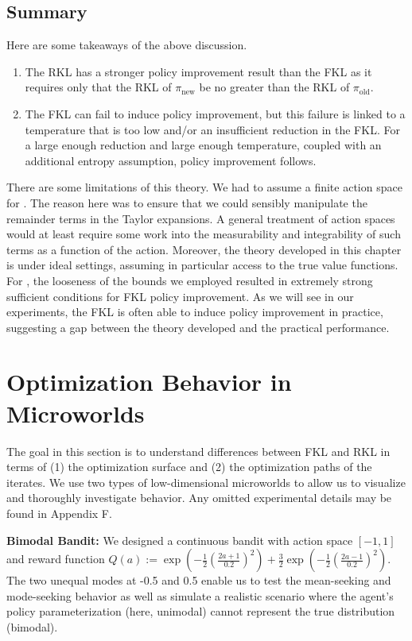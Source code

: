 \documentclass[twoside,11pt]{article}
\newcommand{\pinew}{{\pi_\mathrm{new}}}
\newcommand{\piold}{{\pi_\mathrm{old}}}
\newcommand{\martha}[1]{{\color{blue} #1 }}
\begin{document}
\subsection{Summary}
Here are some takeaways of the above discussion. 
\begin{enumerate}
    \item The RKL has a stronger policy improvement result than the FKL as it requires only that the RKL of $\pinew$ be no greater than the RKL of $\piold$.
    \item The FKL can fail to induce policy improvement, but this failure is linked to a temperature that is too low and/or an insufficient reduction in the FKL. For a large enough reduction and large enough temperature, coupled with an additional entropy assumption, policy improvement follows. 
\end{enumerate}


There are some limitations of this theory. We had to assume a finite action space for . The reason here was to ensure that we could sensibly manipulate the remainder terms in the Taylor expansions. A general treatment of action spaces would at least require some work into the measurability and integrability of such terms as a function of the action. Moreover, the theory developed in this chapter is under ideal settings, assuming in particular access to the true value functions. For , the looseness of the bounds we employed resulted in extremely strong sufficient conditions for FKL policy improvement. As we will see in our experiments, the FKL is often able to induce policy improvement in practice, suggesting a gap between the theory developed and the practical performance. 

\section{Optimization Behavior in Microworlds}

The goal in this section is to understand differences between FKL and RKL in terms of (1) the optimization surface and (2) the optimization paths of the iterates. We use two types of low-dimensional microworlds to allow us to visualize and thoroughly investigate behavior. Any omitted experimental details may be found in Appendix F. 


\textbf{Bimodal Bandit:} We designed a continuous bandit with action space $[-1, 1]$ and reward function $Q(a) := \exp( -\tfrac{1}{2} (\tfrac{2 a + 1}{0.2})^2 ) + \tfrac{3}{2} \exp(-\tfrac{1}{2} (\tfrac{2 a - 1}{0.2})^2)$. The two unequal modes at -0.5 and 0.5 enable us to test the mean-seeking and mode-seeking behavior as well as simulate a realistic scenario where the agent's policy parameterization (here, unimodal) cannot represent the true distribution (bimodal). 
\end{document}
